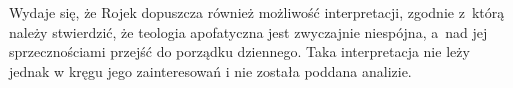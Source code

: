 Wydaje się, że Rojek dopuszcza również możliwość interpretacji, zgodnie z~którą należy stwierdzić, że teologia apofatyczna jest
zwyczajnie niespójna, a~nad jej sprzecznościami przejść do porządku dziennego. Taka interpretacja nie leży jednak w kręgu jego  zainteresowań i nie została poddana analizie.



%
%
%
%

